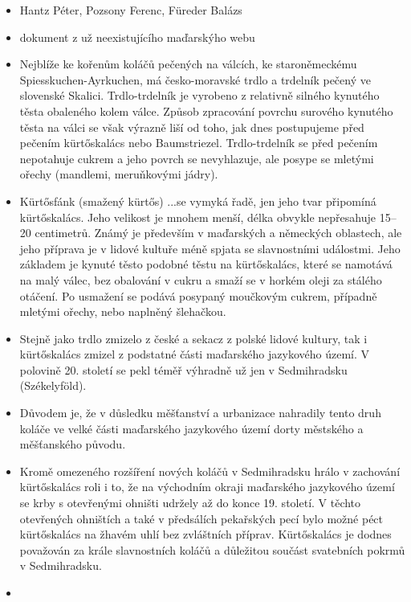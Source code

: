 \begin{itemize}
  \begin{itemize}
  \tightlist
  \item
    Hantz Péter, Pozsony Ferenc, Füreder Balázs
  \item
    dokument z už neexistujícího maďarskýho webu
  \item
    Nejblíže ke kořenům koláčů pečených na válcích, ke staroněmeckému
    Spiesskuchen-Ayrkuchen, má česko-moravské trdlo a trdelník pečený ve
    slovenské Skalici. Trdlo-trdelník je vyrobeno z relativně silného
    kynutého těsta obaleného kolem válce. Způsob zpracování povrchu
    surového kynutého těsta na válci se však výrazně liší od toho, jak
    dnes postupujeme před pečením kürtőskalács nebo Baumstriezel.
    Trdlo-trdelník se před pečením nepotahuje cukrem a jeho povrch se
    nevyhlazuje, ale posype se mletými ořechy (mandlemi, meruňkovými
    jádry).
  \item
    Kürtősfánk (smažený kürtős) ...se vymyká řadě, jen jeho tvar
    připomíná kürtőskalács. Jeho velikost je mnohem menší, délka obvykle
    nepřesahuje 15--20 centimetrů. Známý je především v maďarských a
    německých oblastech, ale jeho příprava je v lidové kultuře méně
    spjata se slavnostními událostmi. Jeho základem je kynuté těsto
    podobné těstu na kürtőskalács, které se namotává na malý válec, bez
    obalování v cukru a smaží se v horkém oleji za stálého otáčení. Po
    usmažení se podává posypaný moučkovým cukrem, případně mletými
    ořechy, nebo naplněný šlehačkou.
  \item
    Stejně jako trdlo zmizelo z české a sekacz z polské lidové kultury,
    tak i kürtőskalács zmizel z podstatné části maďarského jazykového
    území. V polovině 20. století se pekl téměř výhradně už jen v
    Sedmihradsku (Székelyföld).
  \item
    Důvodem je, že v důsledku měšťanství a urbanizace nahradily tento
    druh koláče ve velké části maďarského jazykového území dorty
    městského a měšťanského původu.
  \item
    Kromě omezeného rozšíření nových koláčů v Sedmihradsku hrálo v
    zachování kürtőskalács roli i to, že na východním okraji maďarského
    jazykového území se krby s otevřenými ohništi udržely až do konce
    19. století. V těchto otevřených ohništích a také v předsálích
    pekařských pecí bylo možné péct kürtőskalács na žhavém uhlí bez
    zvláštních příprav. Kürtőskalács je dodnes považován za krále
    slavnostních koláčů a důležitou součást svatebních pokrmů v
    Sedmihradsku.
  \item

\end{itemize}
\end{itemize}
